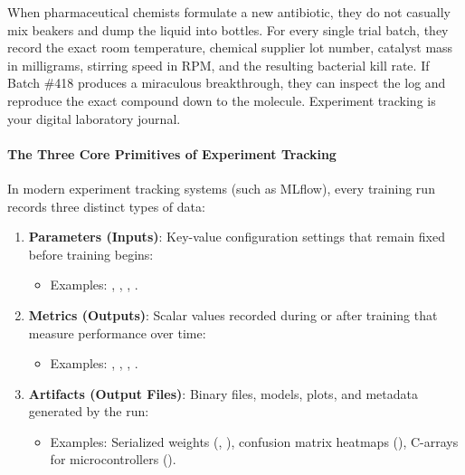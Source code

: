 \begin{analogy}
When pharmaceutical chemists formulate a new antibiotic, they do not casually mix beakers and dump the liquid into bottles. For every single trial batch, they record the exact room temperature, chemical supplier lot number, catalyst mass in milligrams, stirring speed in RPM, and the resulting bacterial kill rate. If Batch \#418 produces a miraculous breakthrough, they can inspect the log and reproduce the exact compound down to the molecule. Experiment tracking is your digital laboratory journal.
\end{analogy}

\paragraph{The Three Core Primitives of Experiment Tracking}
In modern experiment tracking systems (such as MLflow), every training run records three distinct types of data:
\begin{enumerate}
    \item \textbf{Parameters (Inputs)}: Key-value configuration settings that remain fixed before training begins:
    \begin{itemize}
        \item Examples: , , , .
    \end{itemize}
    \item \textbf{Metrics (Outputs)}: Scalar values recorded during or after training that measure performance over time:
    \begin{itemize}
        \item Examples: , , , .
    \end{itemize}
    \item \textbf{Artifacts (Output Files)}: Binary files, models, plots, and metadata generated by the run:
    \begin{itemize}
        \item Examples: Serialized weights (, ), confusion matrix heatmaps (), C-arrays for microcontrollers ().
    \end{itemize}
\end{enumerate}

